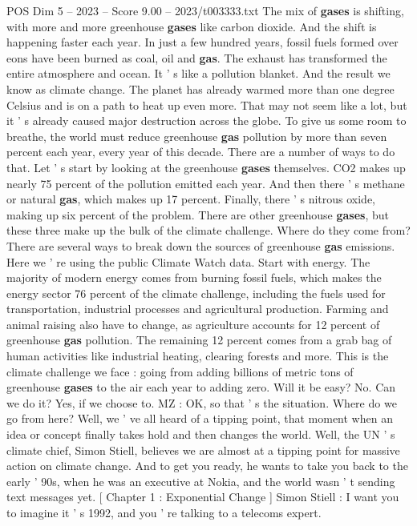 \begin{textsample}{POS Dim 5 – 2023 – Score 9.00 – 2023/t003333.txt}
The mix of \textbf{gases} is shifting, with more and more greenhouse \textbf{gases} like carbon dioxide.
And the shift is happening faster each year.
In just a few hundred years, fossil fuels formed over eons have been burned as coal, oil and \textbf{gas}.
The exhaust has transformed the entire atmosphere and ocean.
It ' s like a pollution blanket.
And the result we know as climate change.
The planet has already warmed more than one degree Celsius and is on a path to heat up even more.
That may not seem like a lot, but it ' s already caused major destruction across the globe.
To give us some room to breathe, the world must reduce greenhouse \textbf{gas} pollution by more than seven percent each year, every year of this decade.
There are a number of ways to do that.
Let ' s start by looking at the greenhouse \textbf{gases} themselves.
CO2 makes up nearly 75 percent of the pollution emitted each year.
And then there ' s methane or natural \textbf{gas}, which makes up 17 percent.
Finally, there ' s nitrous oxide, making up six percent of the problem.
There are other greenhouse \textbf{gases}, but these three make up the bulk of the climate challenge.
Where do they come from?
There are several ways to break down the sources of greenhouse \textbf{gas} emissions.
Here we ' re using the public Climate Watch data.
Start with energy.
The majority of modern energy comes from burning fossil fuels, which makes the energy sector 76 percent of the climate challenge, including the fuels used for transportation, industrial processes and agricultural production.
Farming and animal raising also have to change, as agriculture accounts for 12 percent of greenhouse \textbf{gas} pollution.
The remaining 12 percent comes from a grab bag of human activities like industrial heating, clearing forests and more.
This is the climate challenge we face : going from adding billions of metric tons of greenhouse \textbf{gases} to the air each year to adding zero.
Will it be easy?
No.
Can we do it?
Yes, if we choose to.
MZ : OK, so that ' s the situation.
Where do we go from here?
Well, we ' ve all heard of a tipping point, that moment when an idea or concept finally takes hold and then changes the world.
Well, the UN ' s climate chief, Simon Stiell, believes we are almost at a tipping point for massive action on climate change.
And to get you ready, he wants to take you back to the early ' 90s, when he was an executive at Nokia, and the world wasn ' t sending text messages yet. [ Chapter 1 : Exponential Change ] Simon Stiell : I want you to imagine it ' s 1992, and you ' re talking to a telecoms expert.

\end{textsample}
